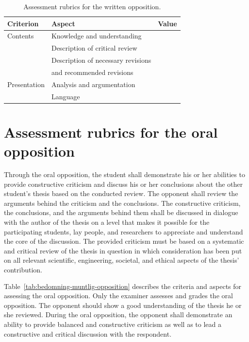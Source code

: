 \documentclass[a4paper,12pt]{book}
\begin{document}
\begin{table}[hbt]
\centering
\caption{Assessment rubrics for the written opposition.}
\label{tab:bedomning-skriftlig-opposition}
\begin{tabular}{|l|l|l|}
\hline
Criterion       & Aspect                                & Value \\\hline     
Contents        & Knowledge and understanding           &       \\\hline
                & Description of critical review        &       \\\hline
                & Description of necessary revisions    &       \\ 
                & and recommended revisions             &       \\\hline     
Presentation    & Analysis and argumentation            &       \\\hline
                & Language                              &       \\
\hline
\end{tabular}
\end{table} 


\section{Assessment rubrics for the oral opposition}
%
Through the oral opposition, the student shall demonstrate his or
her abilities to provide constructive criticism and discuss
his or her conclusions about the other student's thesis based on
the conducted review. The opponent shall review the arguments behind
the criticism and the conclusions. The constructive criticism,
the conclusions, and the arguments behind them shall be discussed
in dialogue with the author of the thesis on a level that makes it
possible for the participating students, lay people, and researchers
to appreciate and understand the core of the discussion. The
provided criticism must be based on a systematic and critical
review of the thesis in question in which consideration has been put on
all relevant scientific, engineering, societal, and ethical aspects
of the thesis' contribution.

Table~\ref{tab:bedomning-muntlig-opposition} describes the criteria and aspects
for assessing the oral opposition. Only the examiner
assesses and grades the oral opposition. The opponent should show a good understanding
of the thesis he or she reviewed. During the oral opposition, the opponent shall
demonstrate an ability to provide balanced and constructive criticism as well as to lead
a constructive and critical discussion with the respondent.
\end{document}
